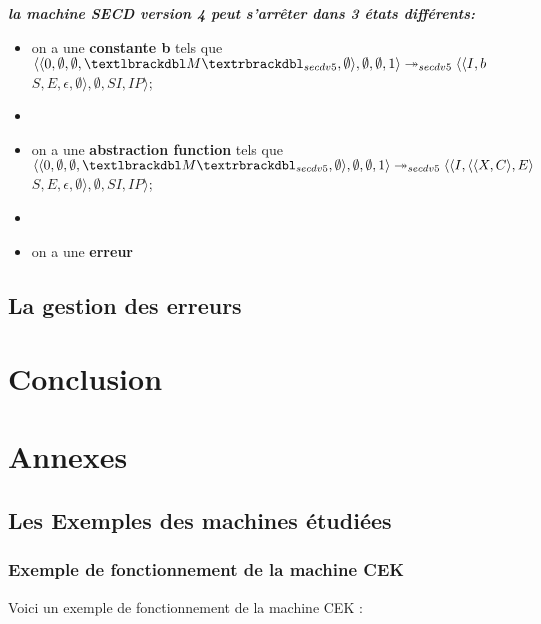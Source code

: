 \documentclass[10pt,a4paper]{article}
\begin{document}
				
				\textbf{\textit{la machine SECD version 4 peut s'arrêter dans 3 états différents:}}
				\smallbreak
				\begin{itemize}
					\item[] on a une \textbf{constante b} tels que 
					$\langle\langle 0,\emptyset,\emptyset,\textlbrackdbl M\textrbrackdbl_{secdv5},\emptyset\rangle,\emptyset,\emptyset,1\rangle 
					\twoheadrightarrow_{secdv5} 
					\langle\langle I,b$ $S,E,\epsilon,\emptyset\rangle,\emptyset,SI,IP\rangle$;
					\item[] 
					\item[] on a une \textbf{abstraction function} tels que
					$\langle\langle 0,\emptyset,\emptyset,\textlbrackdbl M\textrbrackdbl_{secdv5},\emptyset\rangle,\emptyset,\emptyset,1\rangle 
					\twoheadrightarrow_{secdv5} 
					\langle\langle I,\langle\langle X,C\rangle,E\rangle$ $S,E,\epsilon,\emptyset\rangle,\emptyset,SI,IP\rangle$;
					\item[] 
					\item[] on a une \textbf{erreur} 
				\end{itemize}
				\newpage
	
	
	
			\subsection{La gestion des erreurs}
	
	\section{Conclusion}
		
		\newpage
		
		
		
	\section{Annexes}
		
		\subsection{Les Exemples des machines étudiées}
				
			\subsubsection{Exemple de fonctionnement de la machine CEK}\label{CEK}
					
				Voici un exemple de fonctionnement de la machine CEK :
					
\end{document}
